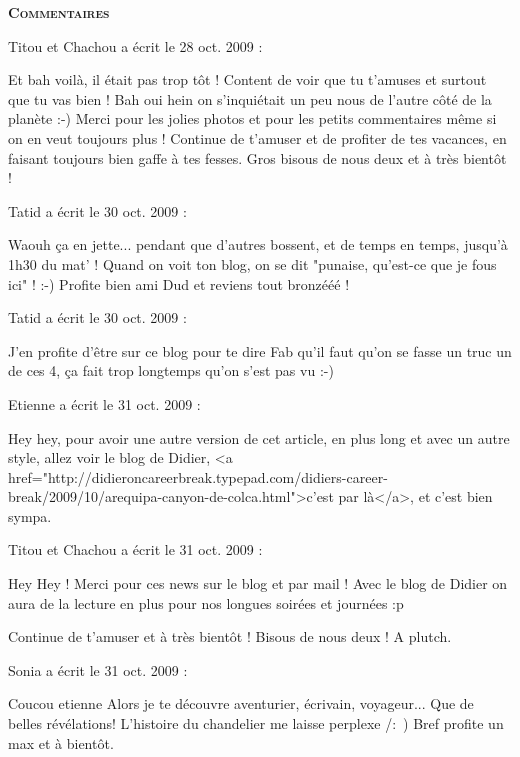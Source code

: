 \bigskip
\textbf{\textsc{Commentaires}}

\medskip
Titou et Chachou a écrit le 28 oct. 2009 :
\begin{displayquote}
Et bah voilà, il était pas trop tôt ! Content de voir que tu t'amuses et surtout que tu vas bien ! Bah oui hein on s'inquiétait un peu nous de l'autre côté de la planète :-)
Merci pour les jolies photos et pour les petits commentaires même si on en veut toujours plus !
Continue de t'amuser et de profiter de tes vacances, en faisant toujours bien gaffe à tes fesses.
Gros bisous de nous deux et à très bientôt !
\end{displayquote}

\medskip
Tatid a écrit le 30 oct. 2009 :
\begin{displayquote}
Waouh ça en jette... pendant que d'autres bossent, et de temps en temps, jusqu'à 1h30 du mat' ! Quand on voit ton blog, on se dit "punaise, qu'est-ce que je fous ici" ! :-)
Profite bien ami Dud et reviens tout bronzééé !
\end{displayquote}

\medskip
Tatid a écrit le 30 oct. 2009 :
\begin{displayquote}
J'en profite d'être sur ce blog pour te dire Fab qu'il faut qu'on se fasse un truc un de ces 4, ça fait trop longtemps qu'on s'est pas vu :-)
\end{displayquote}

\medskip
Etienne a écrit le 31 oct. 2009 :
\begin{displayquote}
Hey hey, pour avoir une autre version de cet article, en plus long et avec un autre style, allez voir le blog de Didier, <a href="http://didieroncareerbreak.typepad.com/didiers-career-break/2009/10/arequipa-canyon-de-colca.html">c'est par là</a>, et c'est bien sympa.
\end{displayquote}

\medskip
Titou et Chachou a écrit le 31 oct. 2009 :
\begin{displayquote}
Hey Hey ! Merci pour ces news sur le blog et par mail ! Avec le blog de Didier on aura de la lecture en plus pour nos longues soirées et journées :p

Continue de t'amuser et à très bientôt !
Bisous de nous deux !
A plutch.
\end{displayquote}

\medskip
Sonia a écrit le 31 oct. 2009 :
\begin{displayquote}
Coucou etienne
Alors je te découvre aventurier, écrivain, voyageur... Que de belles révélations!
L'histoire du chandelier me laisse perplexe /:~)
Bref profite un max et à bientôt.
\end{displayquote}

